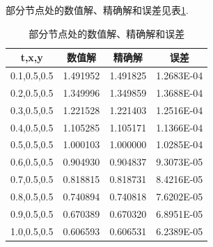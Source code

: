 \documentclass[withoutpreface,bwprint]{cumcmthesis} %
\begin{document}
部分节点处的数值解、精确解和误差见表\ref{tab:1}.
\begin{table}[htbp]
	\centering
	\caption{部分节点处的数值解、精确解和误差}
	\begin{tabular}{cccc}
		\toprule[1.5pt]
		t,x,y & 数值解   & 精确解   & 误差 \\
		\midrule[1pt]
		0.1,0.5,0.5 & 1.491952  & 1.491825  & 1.2683E-04 \\
		0.2,0.5,0.5 & 1.349996  & 1.349859  & 1.3688E-04 \\
		0.3,0.5,0.5 & 1.221528  & 1.221403  & 1.2516E-04 \\
		0.4,0.5,0.5 & 1.105285  & 1.105171  & 1.1366E-04 \\
		0.5,0.5,0.5 & 1.000103  & 1.000000  & 1.0285E-04 \\
		0.6,0.5,0.5 & 0.904930  & 0.904837  & 9.3073E-05 \\
		0.7,0.5,0.5 & 0.818815  & 0.818731  & 8.4216E-05 \\
		0.8,0.5,0.5 & 0.740894  & 0.740818  & 7.6202E-05 \\
		0.9,0.5,0.5 & 0.670389  & 0.670320  & 6.8951E-05 \\
		1.0,0.5,0.5 & 0.606593  & 0.606531  & 6.2389E-05 \\
		\bottomrule[1.5pt]
	\end{tabular}%
	\label{tab:1}%
\end{table}%
\end{document}

